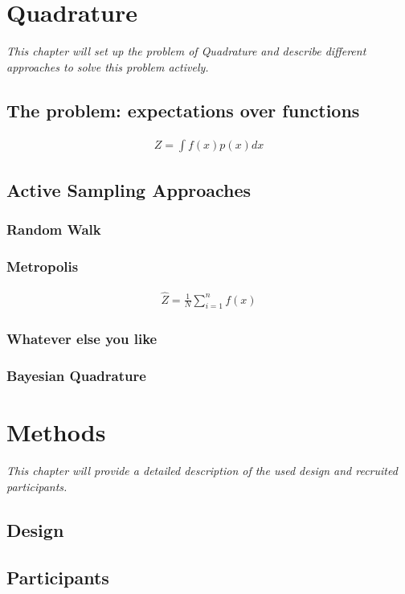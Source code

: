 \documentclass[oneside, 11pt]{book}
\begin{document}
\chapter{Quadrature}
\emph{This chapter will set up the problem of Quadrature and describe different approaches to solve this problem actively.}

\section{The problem: expectations over functions}
\begin{align}
Z=\int f(x)p(x) dx
\end{align}
\section{Active Sampling Approaches}
\subsection{Random Walk}
\subsection{Metropolis}
\begin{align}
\hat{Z}=\frac{1}{N}\sum_{i=1}^nf(x)
\end{align}
\subsection{Whatever else you like}
\subsection{Bayesian Quadrature}


\chapter{Methods}
\emph{This chapter will provide a detailed description of the used design and recruited participants.}
\section{Design}
\section{Participants}
\end{document}
